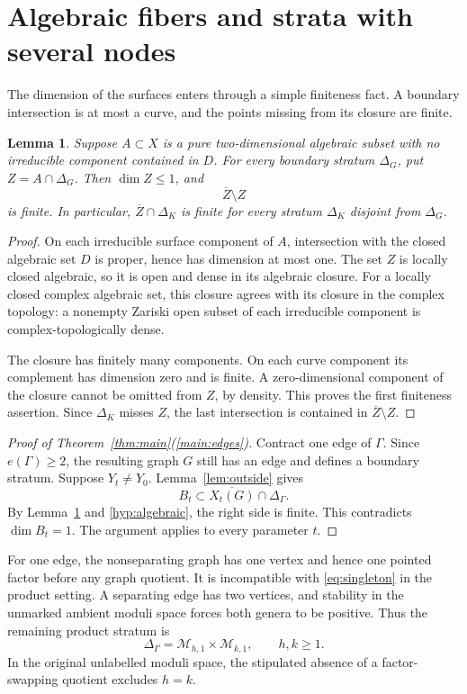 \documentclass[11pt]{article}
\newcommand{\M}{\mathcal M}
\newcommand{\cl}[1]{\overline{#1}}
\newtheorem{lemma}[theorem]{Lemma}
\theoremstyle{definition}
\theoremstyle{remark}
\begin{document}
\section{Algebraic fibers and strata with several nodes}\label{sec:algebraic}

The dimension of the surfaces enters through a simple finiteness fact. A boundary intersection is at most a curve, and the points missing from its closure are finite.

\begin{lemma}\label{lem:frontier}
Suppose $A\subset X$ is a pure two-dimensional algebraic subset with no irreducible component contained in $D$. For every boundary stratum $\Delta_G$, put $Z=A\cap\Delta_G$. Then $\dim Z\leq1$, and
\[
 \cl Z\setminus Z
\]
is finite. In particular, $\cl Z\cap\Delta_K$ is finite for every stratum $\Delta_K$ disjoint from $\Delta_G$.
\end{lemma}

\begin{proof}
On each irreducible surface component of $A$, intersection with the closed algebraic set $D$ is proper, hence has dimension at most one. The set $Z$ is locally closed algebraic, so it is open and dense in its algebraic closure. For a locally closed complex algebraic set, this closure agrees with its closure in the complex topology: a nonempty Zariski open subset of each irreducible component is complex-topologically dense.

The closure has finitely many components. On each curve component its complement has dimension zero and is finite. A zero-dimensional component of the closure cannot be omitted from $Z$, by density. This proves the first finiteness assertion. Since $\Delta_K$ misses $Z$, the last intersection is contained in $\cl Z\setminus Z$.
\end{proof}

\begin{proof}[Proof of Theorem~\ref{thm:main}(\ref{main:edges})]
Contract one edge of $\Gamma$. Since $e(\Gamma)\geq2$, the resulting graph $G$ still has an edge and defines a boundary stratum. Suppose $Y_t\ne Y_0$. Lemma~\ref{lem:outside} gives
\[
 B_t\subset\cl{X_t(G)}\cap\Delta_\Gamma.
\]
By Lemma~\ref{lem:frontier} and \eqref{hyp:algebraic}, the right side is finite. This contradicts $\dim B_t=1$. The argument applies to every parameter $t$.
\end{proof}

For one edge, the nonseparating graph has one vertex and hence one pointed factor before any graph quotient. It is incompatible with \eqref{eq:singleton} in the product setting. A separating edge has two vertices, and stability in the unmarked ambient moduli space forces both genera to be positive. Thus the remaining product stratum is
\begin{equation}\label{eq:separating}
 \Delta_\Gamma=\M_{h,1}\times\M_{k,1},\qquad h,k\geq1.
\end{equation}
In the original unlabelled moduli space, the stipulated absence of a factor-swapping quotient excludes $h=k$.
\end{document}
